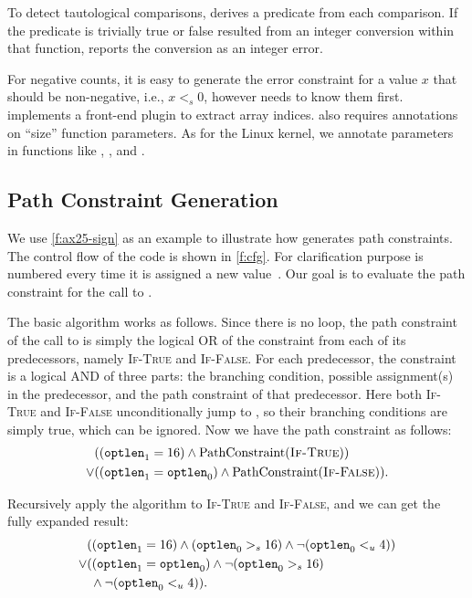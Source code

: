 To detect tautological comparisons, \sys derives a predicate from
each comparison.  If the predicate is trivially true or false
resulted from an integer conversion within that function, \sys
reports the conversion as an integer error.

For negative counts, it is easy to generate the error constraint
for a value $x$ that should be non-negative, i.e., $x <_s 0$, however
\sys needs to know them first.  \sys implements a front-end plugin
to extract array indices.  \sys also requires annotations on ``size''
function parameters.  As for the Linux kernel, we annotate parameters
in functions like , , and
.

\subsection{Path Constraint Generation}

We use \autoref{f:ax25-sign} as an example to illustrate how \sys
generates path constraints.  The control flow of the code is shown
in \autoref{f:cfg}.  For clarification purpose  is
numbered every time it is assigned a new
value~\cite[\chapterautorefname~8.11]{whale}.  Our goal is to
evaluate the path constraint for the call to .

The basic algorithm works as follows.  Since there is no loop, the
path constraint of the call to  is simply the
logical OR of the constraint from each of its predecessors, namely
\textsc{If-True} and \textsc{If-False}.  For each predecessor, the
constraint is a logical AND of three parts: the branching condition,
possible assignment(s) in the predecessor, and the path constraint
of that predecessor.  Here both \textsc{If-True} and \textsc{If-False}
unconditionally jump to , so their branching
conditions are simply true, which can be ignored.  Now we have the
path constraint as follows:
%
\begin{align*}
& ((\texttt{optlen}_1 = 16) \land \operatorname{PathConstraint}(\textsc{If-True})) \\
\lor & ((\texttt{optlen}_1 = \texttt{optlen}_0) \land \operatorname{PathConstraint}(\textsc{If-False})).
\end{align*}

Recursively apply the algorithm to \textsc{If-True} and \textsc{If-False},
and we can get the fully expanded result:
%
\begin{align*}
& ((\texttt{optlen}_1 = 16) \land (\texttt{optlen}_0 >_s 16)
    \land \neg(\texttt{optlen}_0 <_u 4)) \\
\lor & ((\texttt{optlen}_1 = \texttt{optlen}_0) \land \neg(\texttt{optlen}_0 >_s 16) \\
     & \; \land \neg(\texttt{optlen}_0 <_u 4)).
\end{align*}

